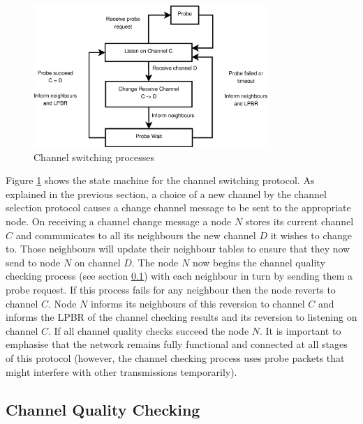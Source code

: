 
\begin{figure}
\centering
\includegraphics[width=3.5in]{Diagram1.eps}
\caption{Channel switching processes}
\label{fig_sim}
\end{figure}

Figure \ref{fig_sim} shows the state machine for the channel switching protocol.
As explained in the previous section, a choice of a new channel by the channel selection protocol causes a change channel message to be sent to the appropriate node. 
On receiving a channel change message a node $N$ stores its current channel $C$ and communicates to all its neighbours the new channel $D$ it wishes to change to.  Those neighbours will update their neighbour tables to ensure that they now send to node $N$ on channel $D$.  The node $N$ now begins the channel quality checking process (see section \ref{sec:channelquality}) with each neighbour in turn by sending them a probe request.  If this process fails for any neighbour then the node reverts to channel $C$.  Node $N$ informs its neighbours of this reversion to channel $C$ and informs the LPBR of the channel checking results and its reversion to listening on channel $C$. If all channel quality checks succeed the node $N$. It is important to emphasise that the network remains fully functional and connected at all stages of this protocol (however, the channel checking process uses probe packets that might interfere with other transmissions temporarily).

\subsection{Channel Quality Checking}
\label{sec:channelquality}

